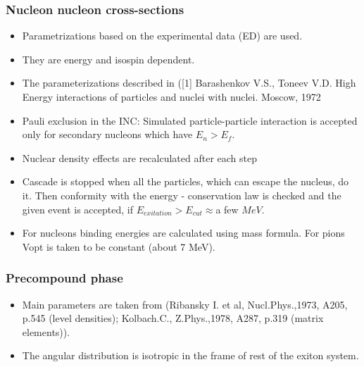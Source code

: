 \subsubsection{Nucleon nucleon cross-sections}
\begin{itemize}
\item Parametrizations based on the experimental data (ED) are used. 
\item They are energy and isospin dependent. 
\item The parameterizations described in ([1] Barashenkov V.S., Toneev V.D. High Energy interactions of particles and nuclei with nuclei. Moscow, 1972 

\item Pauli exclusion in the INC: Simulated particle-particle interaction is accepted only for secondary nucleons which have $E_n > E_f$.

\item Nuclear density effects are recalculated after each step

\item Cascade is stopped when all the particles, which can escape the nucleus, do it. Then conformity with the energy - conservation law is checked and the given event is accepted, if $E_{exitation} > E_{cut} \approx $a few $MeV$.

\item For nucleons binding energies are calculated using mass formula. For pions Vopt is taken to be constant (about 7 MeV).
\end{itemize}


\subsubsection{Precompound phase}
\begin{itemize}

\item Main parameters are taken from (Ribansky I. et al, Nucl.Phys.,1973, A205, p.545 (level densities); Kolbach.C., Z.Phys.,1978, A287, p.319 (matrix elements)). 
\item The angular distribution is isotropic in the frame of rest of the exiton system.
\end{itemize}

